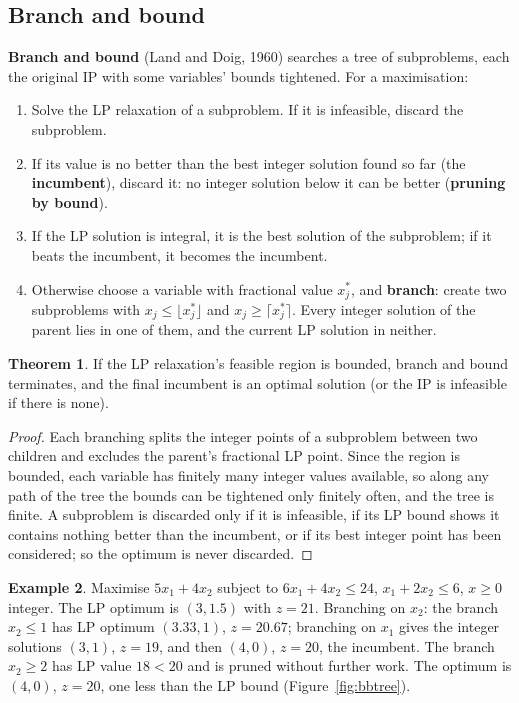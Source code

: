 \documentclass[11pt,a4paper]{article}
\numberwithin{equation}{section}
\theoremstyle{definition}
\newtheorem{thm}{Theorem}[subsection]
\newtheorem{exa}[thm]{Example}
\begin{document}
\subsection{Branch and bound}
\label{ssec:branchbound}

\textbf{Branch and bound} (Land and Doig, 1960) searches a tree of subproblems, each the original IP with some variables' bounds tightened. For a maximisation:
\begin{enumerate}[label=(\arabic*)]
\item Solve the LP relaxation of a subproblem. If it is infeasible, discard the subproblem.
\item If its value is no better than the best integer solution found so far (the \textbf{incumbent}), discard it: no integer solution below it can be better (\textbf{pruning by bound}).
\item If the LP solution is integral, it is the best solution of the subproblem; if it beats the incumbent, it becomes the incumbent.
\item Otherwise choose a variable with fractional value $x_j^*$, and \textbf{branch}: create two subproblems with $x_j \leq \lfloor x_j^*\rfloor$ and $x_j \geq \lceil x_j^*\rceil$. Every integer solution of the parent lies in one of them, and the current LP solution in neither.
\end{enumerate}

\begin{thm}
\label{thm:bb}
If the LP relaxation's feasible region is bounded, branch and bound terminates, and the final incumbent is an optimal solution (or the IP is infeasible if there is none).
\end{thm}

\begin{proof}
Each branching splits the integer points of a subproblem between two children and excludes the parent's fractional LP point. Since the region is bounded, each variable has finitely many integer values available, so along any path of the tree the bounds can be tightened only finitely often, and the tree is finite. A subproblem is
discarded only if it is infeasible, if its LP bound shows it contains nothing better than the incumbent, or if its best integer point has been considered; so the optimum is never discarded.
\end{proof}

\begin{exa}
\label{ex:bb}
Maximise $5x_1 + 4x_2$ subject to $6x_1 + 4x_2 \leq 24$, $x_1 + 2x_2 \leq 6$, $x \geq 0$ integer. The LP optimum is $(3, 1.5)$ with $z = 21$. Branching on $x_2$: the branch $x_2 \leq 1$ has LP optimum $(3.33, 1)$, $z = 20.67$; branching on $x_1$ gives the integer solutions $(3, 1)$, $z = 19$, and then $(4, 0)$, $z = 20$, the
incumbent. The branch $x_2 \geq 2$ has LP value $18 < 20$ and is pruned without further work. The optimum is $(4, 0)$, $z = 20$, one less than the LP bound (Figure~\ref{fig:bbtree}).
\end{exa}
\end{document}
